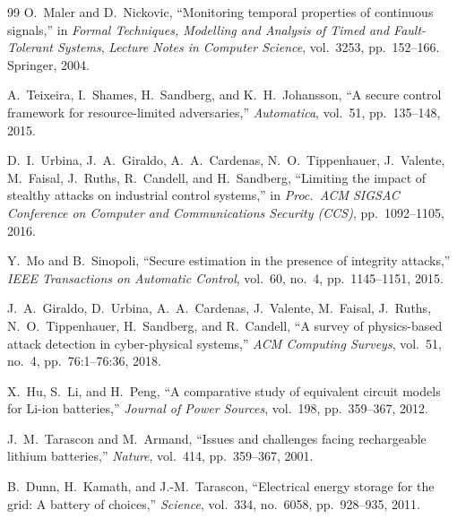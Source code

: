 \begin{thebibliography}{99}
O.~Maler and D.~Nickovic,
``Monitoring temporal properties of continuous signals,''
in \emph{Formal Techniques, Modelling and Analysis of Timed and Fault-Tolerant Systems},
\emph{Lecture Notes in Computer Science}, vol.~3253, pp.~152--166. Springer, 2004.


A.~Teixeira, I.~Shames, H.~Sandberg, and K.~H.~Johansson,
``A secure control framework for resource-limited adversaries,''
\emph{Automatica}, vol.~51, pp.~135--148, 2015.

D.~I.~Urbina, J.~A.~Giraldo, A.~A.~Cardenas, N.~O.~Tippenhauer, J.~Valente,
M.~Faisal, J.~Ruths, R.~Candell, and H.~Sandberg,
``Limiting the impact of stealthy attacks on industrial control systems,''
in \emph{Proc.\ ACM SIGSAC Conference on Computer and Communications Security (CCS)},
pp.~1092--1105, 2016.

Y.~Mo and B.~Sinopoli,
``Secure estimation in the presence of integrity attacks,''
\emph{IEEE Transactions on Automatic Control}, vol.~60, no.~4, pp.~1145--1151, 2015.

J.~A.~Giraldo, D.~Urbina, A.~A.~Cardenas, J.~Valente, M.~Faisal, J.~Ruths,
N.~O.~Tippenhauer, H.~Sandberg, and R.~Candell,
``A survey of physics-based attack detection in cyber-physical systems,''
\emph{ACM Computing Surveys}, vol.~51, no.~4, pp.~76:1--76:36, 2018.


X.~Hu, S.~Li, and H.~Peng,
``A comparative study of equivalent circuit models for Li-ion batteries,''
\emph{Journal of Power Sources}, vol.~198, pp.~359--367, 2012.

J.~M.~Tarascon and M.~Armand,
``Issues and challenges facing rechargeable lithium batteries,''
\emph{Nature}, vol.~414, pp.~359--367, 2001.

B.~Dunn, H.~Kamath, and J.-M.~Tarascon,
``Electrical energy storage for the grid: A battery of choices,''
\emph{Science}, vol.~334, no.~6058, pp.~928--935, 2011.


\end{thebibliography}
